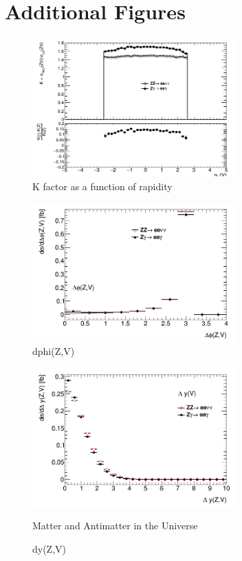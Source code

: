 \documentclass[11pt,a4paper,openright,twoside]{report}
\begin{document}
\chapter{Additional Figures}
\begin{figure}[H]
\centering
	\includegraphics[width=0.7\textwidth]{K_y.png}
	\caption{K factor as a function of rapidity}
	\label{fig:K_y}
\end{figure}
\begin{figure}[H]
\centering
	\includegraphics[width=0.7\textwidth]{dphi.png}
	\caption{dphi(Z,V)}
	\label{fig:dphi}
\end{figure}
\begin{figure}[H]
\centering
	\includegraphics[width=0.7\textwidth]{dy.png}
	\caption{dy(Z,V)}Matter and Antimatter in the Universe
\end{figure}
\end{document}
